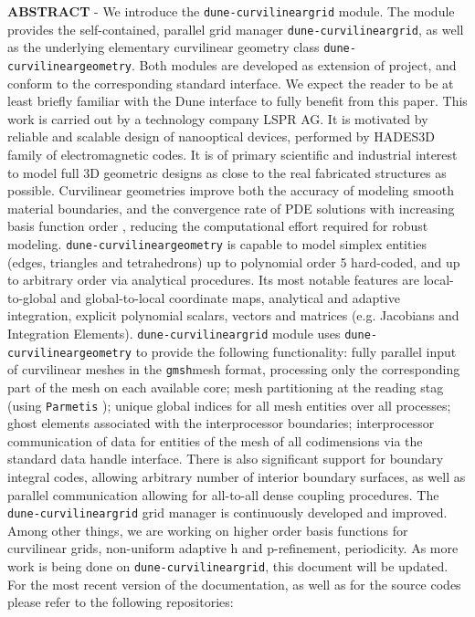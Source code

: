 \documentclass[a4paper,11pt]{book}
\newcommand{\citeParMetis}{\cite{schloegel+2002, lasalle+2013}}
\newcommand{\citeGMSH}{\cite{geuzaine+2009}}
\newcommand{\citeDune}{\cite{bastian+2008}}
\begin{document}
\begin{titlepage}
\noindent \textbf{\textsc{ABSTRACT}} - We introduce the \texttt{dune-curvilineargrid} module. The module provides the self-contained, parallel grid manager \texttt{dune-curvilineargrid}, as well as the underlying elementary curvilinear geometry class \texttt{dune-curvilineargeometry}. Both modules are developed as extension of  \citeDune project, and conform to the corresponding standard interface. We expect the reader to be at least briefly familiar with the Dune interface to fully benefit from this paper.
This work is carried out by a technology company LSPR AG. It is motivated by reliable and scalable design of nanooptical devices, performed by HADES3D family of electromagnetic codes. It is of primary scientific and industrial interest to model full 3D geometric designs as close to the real fabricated structures as possible. Curvilinear geometries improve both the accuracy of modeling smooth material boundaries, and the convergence rate of PDE solutions with increasing basis function order \cite{fahs2011}, reducing the computational effort required for robust modeling.
\texttt{dune-curvilineargeometry} is capable to model simplex entities (edges, triangles and tetrahedrons) up to polynomial order 5 hard-coded, and up to arbitrary order via analytical procedures. Its most notable features are local-to-global and global-to-local coordinate maps, analytical and adaptive integration, explicit polynomial scalars, vectors and matrices (e.g. Jacobians and Integration Elements).
\texttt{dune-curvilineargrid} module uses \texttt{dune-curvilineargeometry} to provide the following functionality: fully parallel input of curvilinear meshes in the \texttt{gmsh}\citeGMSH mesh format, processing only the corresponding part of the mesh on each available core; mesh partitioning at the reading stag (using \texttt{Parmetis} \citeParMetis); unique global indices for all mesh entities over all processes; ghost elements associated with the interprocessor boundaries; interprocessor communication of data for entities of the mesh of all codimensions via the standard  data handle interface. There is also significant support for boundary integral codes, allowing arbitrary number of interior boundary surfaces, as well as parallel communication allowing for all-to-all dense coupling procedures.
The \texttt{dune-curvilineargrid} grid manager is continuously developed and improved. Among other things, we are working on higher order basis functions for curvilinear grids, non-uniform adaptive h and p-refinement, periodicity. 
As more work is being done on \texttt{dune-curvilineargrid}, this document will be updated. For the most recent version of the documentation, as well as for the source codes please refer to the following repositories: \\


\end{titlepage}
\end{document}

